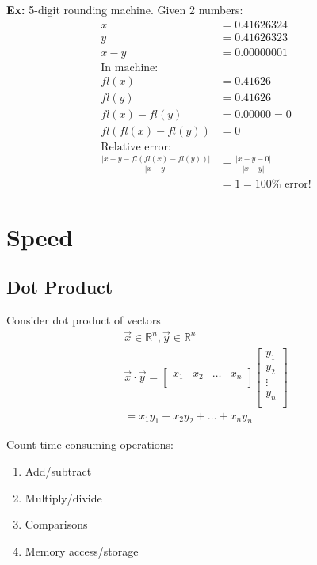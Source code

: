 \documentclass[12pt, letterpaper]{article}
\begin{document}
\noindent \textbf{Ex: } 5-digit rounding machine. Given 2 numbers:
\begin{align*}
x &= 0.41626324 \\
y &= 0.41626323 \\
x-y &= 0.00000001 \\
\text{In machine:} \\
fl(x) &= 0.41626 \\
fl(y) &= 0.41626 \\
fl(x)-fl(y) &= 0.00000 = 0 \\
fl(fl(x)-fl(y)) &= 0 \\ 
\text{Relative error:} \\
\frac{|x-y-fl(fl(x)-fl(y))|}{|x-y|} &= \frac{|x-y-0|}{|x-y|}\\
&= 1 = 100\% \text{ error!}
\end{align*}

\section{Speed}
\subsection{Dot Product}

Consider dot product of vectors
\begin{gather*}
\vec{x} \in \mathbb{R}^n, \vec{y} \in \mathbb{R}^n \\
\vec{x} \cdot \vec{y} = 
\begin{bmatrix}
    x_1 & x_2 & \ldots & x_n \\
\end{bmatrix}
\begin{bmatrix}
    y_1 \\ y_2 \\ \vdots \\ y_n \\
\end{bmatrix} \\
= x_1y_1 + x_2y_2 + \ldots + x_ny_n
\end{gather*}

\noindent Count time-consuming operations:
\begin{enumerate}
    \item Add/subtract
    \item Multiply/divide
    \item Comparisons
    \item Memory access/storage
\end{enumerate}
\end{document}
